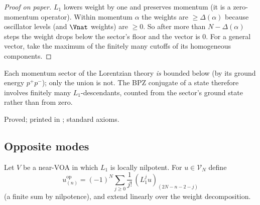 \begin{proof}[Proof on paper]
$L_1$ lowers weight by one and preserves momentum (it is a zero-momentum operator).  Within momentum $\alpha$ the weights
are $\ge \Delta(\alpha)$ because oscillator levels (and $\Vnat$ weights) are $\ge0$.  So after more than $N-\Delta(\alpha)$ steps the weight
drops below the sector's floor and the vector is $0$.  For a general vector, take the maximum of the finitely many
cutoffs of its homogeneous components.
\end{proof}

\begin{physics}
Each momentum sector of the Lorentzian theory \emph{is} bounded below (by its ground energy $p^+p^-$); only the union is
not.  The BPZ conjugate of a state therefore involves finitely many $L_1$-descendants, counted from the sector's ground
state rather than from zero.
\end{physics}

\begin{status}
Proved; printed in ; standard axioms.
\end{status}

\subsection{Opposite modes}

\begin{definition}\label{ch17:def:opposite}
Let $V$ be a near-VOA in which $L_1$ is locally nilpotent.  For $u\in\mathcal V_N$ define
\begin{equation*}
  u^{\mathrm{op}}_{(n)}=(-1)^N\sum_{j\ge0}\frac1{j!}\,(L_1^ju)_{(2N-n-2-j)}
\end{equation*}
(a finite sum by nilpotence), and extend linearly over the weight decomposition.
\end{definition}

